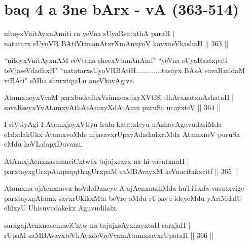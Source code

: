 \section*{baq 4 a 3ne  bArx - vA (363-514)}

\begin{shl}
nitoyxV\s nitAyxnAmiti ca yeVna sUyaRsatxthA paraH | \\
natatarx sUyoVR BAtiVtimanAtxrXmAnxyoV hayxneVkashaH \hfill||  363 || 
\end{shl}


\begin{artha}
``nitoyxV\s nitAyxnAM ceVtana shecxVtanAnAmf" ``yeVna sUyaRsatxpati teVjaseVdadhxH" ``natatarxsUyoVRBAtiH.............tasayx BAsA savaRmidaM viBAti" eMba shurxtigaLu aneVkavAgive.
\end{artha}

\begin{shl}
AtamxneyxVvaM parxbudedhxV\s simxcnojxyXVtiSi dhAvxnatxnAshataH | \\
savaRseyxYvA\s \s tamxyAthAtAmxyXdAtAmx puruSa ucayxteV \hfill||  364 ||  
\end{shl}

\begin{artha}
I riVtiyAgi I AtamxjoyxVtiyu iralu katatxleyu nAshavAguvudariMda elalxdakUkx AtamxvoMde nijasavxrUpavAdadadxriMda AtamxneV puruSa eMdu heVLalapxDuvanu.
\end{artha}


\begin{shl}
AtAmxjAcnxnasamuciCxtwtx tajajxsayx na hi vasutxnaH | \\
parxtayxgUrxpAtapxqqthagUrxpaM saMBAvayxM keVnacitakxcitf \hfill||  365 ||  
\end{shl}

\begin{artha}
Atamxna ajAcnxnavu hoVdoDaneye A ajAcnxnadiMda huTiTxda vasutxvige parxtayxgAtamx savxrUkikxMta beVre oMdu rUpavu ideyeMdu yAriMdalU elilxyU Uhisuvudakekx Aguvudilalx.
\end{artha}


\begin{shl}
sarxgajAcnxnasamuciCxtw na tajajxsAyxnayxtaH sarxjaH | \\
rUpaM saMBAvayxteV\s hAyxdeVreVvamAtamxsavxrUpataH \hfill||  366 ||  
\end{shl}
				
